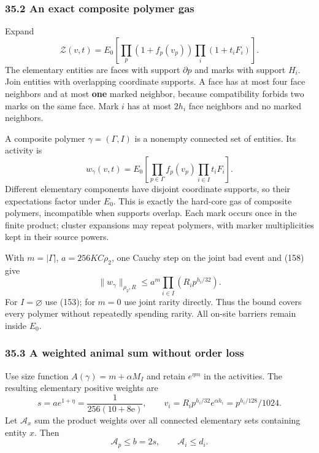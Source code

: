 \documentclass[11pt,a4paper]{article}
\begin{document}
\hypertarget{an-exact-composite-polymer-gas}{%
\subsubsection{35.2 An exact composite polymer
gas}\label{an-exact-composite-polymer-gas}}

Expand \[\mathcal Z(v,t)=E_0\left[
 \prod_p(1+f_p(v_p))\prod_i(1+t_iF_i)\right].\] The elementary entities
are faces with support \(\partial p\) and marks with support \(H_i\).
Join entities with overlapping coordinate supports. A face has at most
four face neighbors and at most \textbf{one} marked neighbor, because
compatibility forbids two marks on the same face. Mark \(i\) has at most
\(2h_i\) face neighbors and no marked neighbors.

A composite polymer \(\gamma=(\Gamma,I)\) is a nonempty connected set of
entities. Its activity is \[w_\gamma(v,t)=E_0\left[
 \prod_{p\in\Gamma}f_p(v_p)\prod_{i\in I}t_iF_i\right].\] Different
elementary components have disjoint coordinate supports, so their
expectations factor under \(E_0\). This is exactly the hard-core gas of
composite polymers, incompatible when supports overlap. Each mark occurs
once in the finite product; cluster expansions may repeat polymers, with
marker multiplicities kept in their source powers.

With \(m=|\Gamma|\), \(a=256KC\rho_2\), one Cauchy step on the joint bad
event and (158) give \[\|w_\gamma\|_{\rho_2,R}
 \le a^m\prod_{i\in I}(R_i p^{h_i/32}).\tag{163}\] For \(I=\varnothing\)
use (153); for \(m=0\) use joint rarity directly. Thus the bound covers
every polymer without repeatedly spending rarity. All on-site barriers
remain inside \(E_0\).

\hypertarget{a-weighted-animal-sum-without-order-loss}{%
\subsubsection{35.3 A weighted animal sum without order
loss}\label{a-weighted-animal-sum-without-order-loss}}

Use size function \(A(\gamma)=m+\alpha M_I\) and retain \(e^{\eta m}\)
in the activities. The resulting elementary positive weights are
\[s=a e^{1+\eta}=\frac1{256(10+8\mathrm e)},\qquad
v_i=R_i p^{h_i/32}e^{\alpha h_i}=p^{h_i/128}/1024.\] Let
\(\mathcal A_x\) sum the product weights over all connected elementary
sets containing entity \(x\). Then
\[\mathcal A_p\le b=2s,\qquad \mathcal A_i\le d_i.\tag{164}\]
\end{document}

